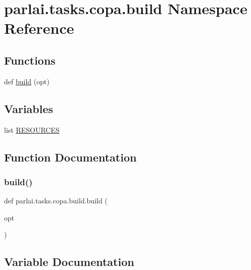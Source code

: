 \hypertarget{namespaceparlai_1_1tasks_1_1copa_1_1build}{}\section{parlai.\+tasks.\+copa.\+build Namespace Reference}
\label{namespaceparlai_1_1tasks_1_1copa_1_1build}
\subsection*{Functions}
\begin{DoxyCompactItemize}
\item 
def \hyperlink{namespaceparlai_1_1tasks_1_1copa_1_1build_a20917f15c830f6a3c2af55808ee584bf}{build} (opt)
\end{DoxyCompactItemize}
\subsection*{Variables}
\begin{DoxyCompactItemize}
\item 
list \hyperlink{namespaceparlai_1_1tasks_1_1copa_1_1build_a62573c3b2b21231246c8e91efdb78c4e}{R\+E\+S\+O\+U\+R\+C\+ES}
\end{DoxyCompactItemize}


\subsection{Function Documentation}
\mbox{\label{namespaceparlai_1_1tasks_1_1copa_1_1build_a20917f15c830f6a3c2af55808ee584bf}} 
\subsubsection{\texorpdfstring{build()}{build()}}
{\footnotesize\ttfamily def parlai.\+tasks.\+copa.\+build.\+build (\begin{DoxyParamCaption}\item[{}]{opt }\end{DoxyParamCaption})}



\subsection{Variable Documentation}
\mbox{\label{namespaceparlai_1_1tasks_1_1copa_1_1build_a62573c3b2b21231246c8e91efdb78c4e}} 
